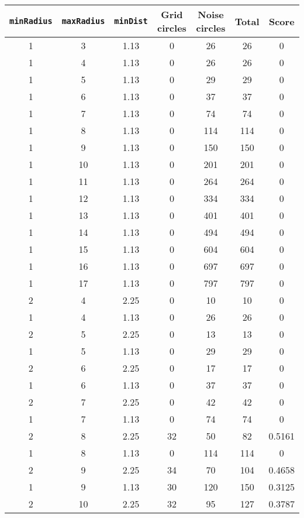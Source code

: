 \documentclass[letterpaper, 12pt]{article}
\begin{document}
\begin{longtable}{|c|c|c|c|c|c|c|}
\hline
\textbf{\texttt{minRadius}} & \textbf{\texttt{maxRadius}} & \textbf{\texttt{minDist}} & \textbf{Grid circles} & \textbf{Noise circles} & \textbf{Total} & \textbf{Score} \\
\hline
1 & 3 & 1.13 & 0 & 26 & 26 & 0 \\
\hline
1 & 4 & 1.13 & 0 & 26 & 26 & 0 \\
\hline
1 & 5 & 1.13 & 0 & 29 & 29 & 0 \\
\hline
1 & 6 & 1.13 & 0 & 37 & 37 & 0 \\
\hline
1 & 7 & 1.13 & 0 & 74 & 74 & 0 \\
\hline
1 & 8 & 1.13 & 0 & 114 & 114 & 0 \\
\hline
1 & 9 & 1.13 & 0 & 150 & 150 & 0 \\
\hline
1 & 10 & 1.13 & 0 & 201 & 201 & 0 \\
\hline
1 & 11 & 1.13 & 0 & 264 & 264 & 0 \\
\hline
1 & 12 & 1.13 & 0 & 334 & 334 & 0 \\
\hline
1 & 13 & 1.13 & 0 & 401 & 401 & 0 \\
\hline
1 & 14 & 1.13 & 0 & 494 & 494 & 0 \\
\hline
1 & 15 & 1.13 & 0 & 604 & 604 & 0 \\
\hline
1 & 16 & 1.13 & 0 & 697 & 697 & 0 \\
\hline
1 & 17 & 1.13 & 0 & 797 & 797 & 0 \\
\hline
2 & 4 & 2.25 & 0 & 10 & 10 & 0 \\
\hline
1 & 4 & 1.13 & 0 & 26 & 26 & 0 \\
\hline
2 & 5 & 2.25 & 0 & 13 & 13 & 0 \\
\hline
1 & 5 & 1.13 & 0 & 29 & 29 & 0 \\
\hline
2 & 6 & 2.25 & 0 & 17 & 17 & 0 \\
\hline
1 & 6 & 1.13 & 0 & 37 & 37 & 0 \\
\hline
2 & 7 & 2.25 & 0 & 42 & 42 & 0 \\
\hline
1 & 7 & 1.13 & 0 & 74 & 74 & 0 \\
\hline
2 & 8 & 2.25 & 32 & 50 & 82 & 0.5161 \\
\hline
1 & 8 & 1.13 & 0 & 114 & 114 & 0 \\
\hline
2 & 9 & 2.25 & 34 & 70 & 104 & 0.4658 \\
\hline
1 & 9 & 1.13 & 30 & 120 & 150 & 0.3125 \\
\hline
2 & 10 & 2.25 & 32 & 95 & 127 & 0.3787 \\

\end{longtable}
\end{document}
